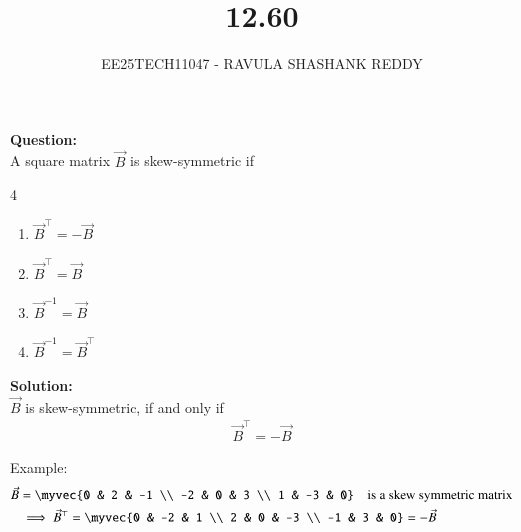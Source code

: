\documentclass[journal]{article}
\begin{document}
	
	
	\vspace{3cm}
	
\title{12.60}
\author{EE25TECH11047 - RAVULA SHASHANK REDDY}
\maketitle
\hrulefill
\bigskip 

\renewcommand{\thetable}{\theenumi}
\setlength{\intextsep}{10pt}

\textbf{Question:} \\

 A square matrix $\vec{B}$ is skew-symmetric if 
\begin{multicols}{4}
\begin{enumerate}[label=\alph*)]
    \item  $\vec{B}^\top = -\vec{B}$ 
    \item  $\vec{B}^\top = \vec{B}$ 
    \item  $\vec{B}^{-1} = \vec{B}$ 
    \item  $\vec{B}^{-1} = \vec{B}^\top$ 
\end{enumerate}
\end{multicols}

\textbf{Solution:}\\

 $\vec{B}$ is  skew-symmetric, if and only if 
 \begin{align}
     \vec{B}^\top = -\vec{B}
 \end{align}

Example: 
\begin{align}
\vec{B} &= \myvec{0 & 2 & -1 \\ -2 & 0 & 3 \\ 1 & -3 & 0} \quad \text{is a skew symmetric matrix}\\
&\implies \vec{B}^\top = \myvec{0 & -2 & 1 \\ 2 & 0 & -3 \\ -1 & 3 & 0} = -\vec{B}
\end{align}
\end{document}
